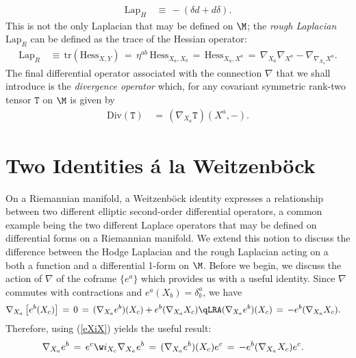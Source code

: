 \documentclass[sections]{tjwNOTES}
\newcommand{\LapH}{\text{Lap}_{H}}
\newcommand{\LapR}{\text{Lap}_{R}}
\newcommand{\Div}{\text{Div}}
\newcommand{\Hess}{\text{Hess}}
\begin{document}
\begin{align}\label{LapH}
	\LapH &\,\equiv\, -(\delta d + d\delta).
\end{align}
This is not the only Laplacian that may be defined on $\M$; the {\it rough Laplacian} $\LapR$ can be defined as the trace of the Hessian operator:
\begin{align}\label{LapR}
	\LapR &\,\equiv\, \text{tr}(\Hess_{X,Y}) \,=\, \eta^{ab}\,\Hess_{X_{a},X_{b}} \,=\, \Hess_{X_{a},X^{a}} \,=\, \nabla_{X_{a}}\nabla_{X^{a}} - \nabla_{\nabla_{X_{a}}X^{a}}.
\end{align}
The final differential operator associated with the connection $\nabla$ that we shall introduce is the {\it divergence operator} which, for any covariant symmetric rank-two tensor $\texttt{T}$ on $\M$ is given by
\begin{align}\label{DIV}
	\Div(\texttt{T}) &\,=\, (\nabla_{X_{a}}\texttt{T})(X^{a},-).
\end{align} 


\section{Two Identities \'{a} la Weitzenb\"{o}ck}
On a Riemannian manifold, a Weitzenb\"{o}ck identity expresses a relationship between two different elliptic second-order differential operators, a common example being the two different Laplace operators that may be defined on differential forms on a Riemannian manifold. We extend this notion to discuss the difference between the Hodge Laplacian and the rough Laplacian acting on a both a function and a differential 1-form on $\M$. Before we begin, we discuss the action of $\nabla$ of the coframe $\{e^{a}\}$ which provides us with a useful identity. Since $\nabla$ commutes with contractions and $e^{a}(X_{b})=\delta^{a}_{b}$, we have
\begin{align*}
	\nabla_{X_{a}}\left[ e^{b}(X_{c}) \right] &\,=\, 0 \,=\, (\nabla_{X_{a}}e^{b})(X_{c}) + e^{b}(\nabla_{X_{a}}X_{c}) \qLRA
	(\nabla_{X_{a}}e^{b})(X_{c}) \,=\, - e^{b}(\nabla_{X_{a}}X_{c}).
\end{align*}
Therefore, using (\ref{eXiX}) yields the useful result:
\begin{align}\label{LapFunc}
	\nabla_{X_{a}}e^{b} &\,=\, e^{c}\w i_{X_{c}}\nabla_{X_{a}}e^{b} \,=\, (\nabla_{X_{a}}e^{b})(X_{c})e^{c} \,=\, - e^{b}(\nabla_{X_{a}}X_{c})e^{c}.
\end{align}
\end{document}
